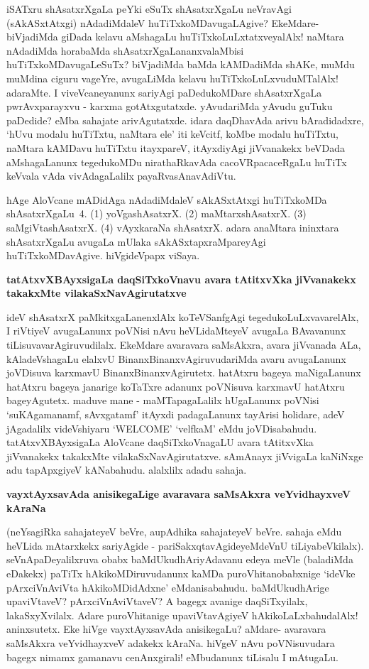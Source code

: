 \noindent
iSATxru shAsatxrXgaLa peYki eSuTx shAsatxrXgaLu neVravAgi (sAkASxtAtxgi) nAdadiMdaleV huTiTxkoMDavugaLA\-give? EkeMdare- biVjadiMda giDada kelavu aMshagaLu huTiTxkoLuLxtatxveyalAlx! naMtara nAdadiMda hora\-baMda shAsatxrXgaLananxvalaMbisi huTiTxkoMDavugaLeSuTx? biVjadiMda baMda kAMDadiMda shAKe, muMdu \hbox{muM\-dina} ciguru vageYre, avugaLiMda kelavu huTiTxkoLuLxvuduMTalAlx! adaraMte. I viveVcane\-yanunx sari\-yAgi paDedukoMDare shAsatxrXgaLa pwrAvxparayxvu - karxma gotAtxgutatxde. yAvudariMda yAvudu guTuku paDe\-dide? eMba sahajate arivAgutatxde. idara daqDhavAda arivu bAradidadxre, `hUvu modalu huTiTxtu, naMtara\- ele' iti keVcitf, koMbe modalu huTiTxtu, naMtara kAMDavu huTiTxtu itayxpareV, itAyxdi\-yAgi jiVvanakekx beVDada aMshagaLanunx tegedukoMDu nirathaRkavAda cacoVRpacaceRgaLu huTiTx keVvala vAda vivAdagaLalilx payaRvasAnavAdiVtu.

hAge AloVcane mADidAga nAdadiMdaleV sAkASxtAtxgi huTiTxkoMDa shAsatxrX\-gaLu~4. (1) yoVgashAsatxrX. (2) maMtarxshAsatxrX. (3) saMgiVtashAsatxrX. (4) vAyxkaraNa shAsatxrX. adara anaMtara ininxtara shAsatxrXgaLu avugaLa mUlaka sAkASxtapxraMpareyAgi huTiTxkoMDavAgive. hiVgideVpapx viSaya.

{\bigskip
\noindent
{\large\bf tatAtxvXBAyxsigaLa daqSiTxkoVnavu avara tAtitxvXka jiVvanakekx takakxMte vilakaSxNavAgi\-rutatxve}}\label{page175}
\medskip

\noindent
ideV shAsatxrX paMkitxgaLanenxlAlx koTeVSanfgAgi tegedukoLuLxvavarelAlx, I riVtiyeV avugaLanunx poVNisi nAvu heVLidaMteyeV avugaLa BAvavanunx tiLisuvava\-rAgiruvudilalx. EkeMdare avaravara saMsAkxra, avara jiVvanada ALa, kAladeVshagaLu elalxvU BinanxBinanxvAgiruvudariMda avaru avugaLanunx joVDisuva karxmavU\- BinanxBinanxvAgirutetx. hatAtxru bageya maNigaLanunx hatAtxru bageya janarige koTaTxre adanunx poVNisuva karxmavU hatAtxru bageyAgutetx. maduve mane - maMTapagaLalilx hUgaLanunx poVNisi `suKAgamanamf, sAvx\-gatamf' itAyxdi padagaLanunx tayArisi holidare, adeV jAgadalilx videVshiyaru {\rm `WELCOME'} `velfkaM' eMdu joVDisabahudu. tatAtxvXBAyxsigaLa AloVcane daqSiTxkoVnagaLU avara tAtitxvXka jiVvanakekx takakxMte vilakaSxNavAgirutatxve. sAmAnayx jiVvigaLa kaNiNxge adu tapApxgiyeV kANabahudu. alalxlilx adadu sahaja.

{\bigskip
\noindent
{\large\bf vayxtAyxsavAda anisikegaLige avaravara saMsAkxra veYvidhayxveV kAraNa}}\label{page176}
\medskip

\noindent
(neYsagiRka sahajateyeV beVre, aupAdhika sahajateyeV beVre. sahaja eMdu \hbox{heVLida} mAtarxkekx sari\-yAgide - pariSakxqtavAgideyeMdeVnU tiLiyabeVkilalx). seVnApaDe\-yalilxruva obabx baMdUkudhAriyAda\-vanu edeya meVle (baladiMda eDakekx) paTiTx hAki\-koMDiruvudanunx kaMDa puroVhitanobabxnige `ideVke\- pArxciVnAviVta hAki\-koMDidAdxne' eMdanisabahudu. baMdUkudhArige upaviVtaveV? pArxciVnA\break\-viVtaveV? A bagegx avanige daqSiTxyilalx, lakaSxyXvilalx. Adare puroVhitanige upaviVtavAgiyeV hAkikoLaLxbahudalAlx! aninx\-sutetx. Eke hiVge vayxtAyxsavAda anisikegaLu? aMdare- avaravara saMsAkxra veYvidhayxveV adakekx kAraNa. hiVgeV nAvu poVNisuvudara bagegx nimamx gamanavu cenAnxgirali! eMbudanunx tiLisalu I mAtugaLu.

